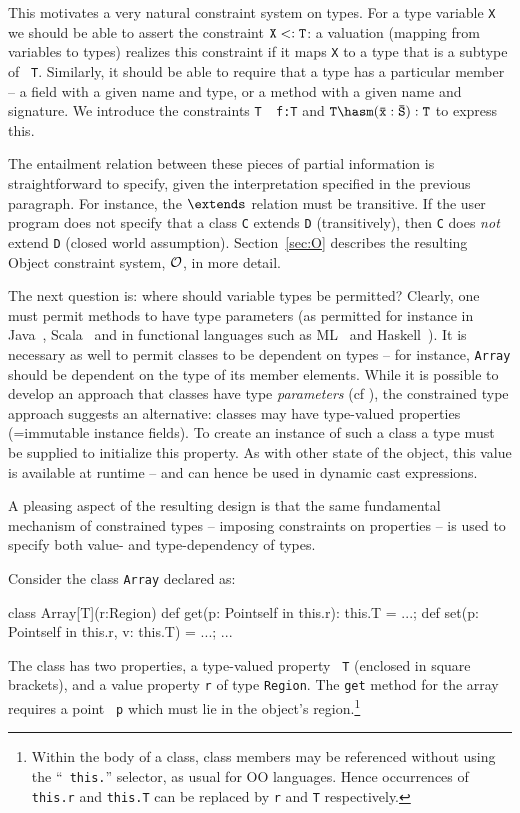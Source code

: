 This motivates a very natural constraint system on types.  For a type
variable {\tt X} we should be able to assert the constraint ${\tt X
<: T}$: a valuation (mapping from variables to types) realizes
this constraint if it maps {\tt X} to a type that is a subtype of {\tt
T}. Similarly, it should be able to require that a type has a
particular member -- a field with a given name and type, or a method
with a given name and signature. We introduce the constraints {\tt T
{}\has\ f:T} and $\tt T \has m(\bar{x}:\bar{S}):T$ to express this.

The entailment relation between these pieces of partial information is
straightforward to specify, given the interpretation specified in the
previous paragraph. For instance, the $\extends$ relation must be
transitive. If the user program does not specify that a class {\tt C}
extends {\tt D} (transitively), then {\tt C} does {\em not} extend
{\tt D} (closed world assumption). Section~\ref{sec:O} describes the
resulting Object constraint system, $\cal O$, in more detail.

The next question is: where should variable types be permitted?
Clearly, one must permit methods to have type parameters (as permitted
for instance in Java~\cite{Java3}, Scala~\cite{scala} and in
functional languages such as ML~\cite{ml} and Haskell~\cite{haskell}).
It is necessary as well to permit classes to be dependent on types --
for instance, {\tt Array} should be dependent on the type of its
member elements. While it is possible to develop an approach that
classes have type {\em parameters} (cf \cite{Java3}), the constrained
type approach suggests an alternative: classes may have type-valued
properties (=immutable instance fields). To create an instance of such
a class a type must be supplied to initialize this property. As with
other state of the object, this value is available at runtime -- and
can hence be used in dynamic cast expressions.

A pleasing aspect of the resulting design is that the same fundamental
mechanism of constrained types -- imposing constraints on properties
-- is used to specify both value- and type-dependency of types.

\begin{example}[Array]
  Consider the class {\tt Array} declared as:
\begin{xten}
class Array[T](r:Region) {
  def get(p: Point{self in this.r}): this.T = ...;
  def set(p: Point{self in this.r}, v: this.T) = ...;
  ...
}
\end{xten}
{}\noindent The class has two properties, a type-valued property {\tt
T} (enclosed in square brackets), and a value property {\tt r} of type
{\tt Region}. The {\tt get} method for the array requires a point {\tt
p} which must lie in the object's region.\footnote{Within the body of
a class, class members may be referenced without using the ``{\tt
this.}'' selector, as usual for OO languages. Hence occurrences of
{\tt this.r} and {\tt this.T} can be replaced by {\tt r} and {\tt T}
respectively.}
\end{example}

